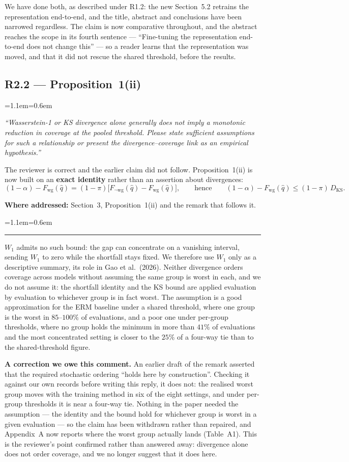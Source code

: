 \documentclass[11pt,a4paper]{article}
\newenvironment{reviewer}
  {\begin{list}{}{\leftmargin=1.1em\rightmargin=0.6em}\item[]\itshape\color{revgrey}\small}
  {\end{list}}
\newenvironment{revised}
  {\begin{list}{}{\leftmargin=1.1em\rightmargin=0.6em}\item[]%
   \color{black}\small\hspace{-1.1em}\textcolor{quoterule}{\rule[-0.4ex]{2pt}{1.05em}}\hspace{0.5em}\ignorespaces}
  {\end{list}}
\newcommand{\where}[1]{{\textbf{Where addressed:} #1\par}}
\newcommand{\rpoint}[2]{\subsection*{#1 --- #2}}
\begin{document}
We have done both, as described under R1.2: the new Section~5.2 retrains the representation
end-to-end, and the title, abstract and conclusions have been narrowed regardless. The claim is now
comparative throughout, and the abstract reaches the scope in its fourth sentence ---
``Fine-tuning the representation end-to-end does not change this'' --- so a reader learns that the
representation was moved, and that it did not rescue the shared threshold, before the results.

\rpoint{R2.2}{Proposition~1(ii)}

\begin{reviewer}
``Wasserstein-1 or KS divergence alone generally does not imply a monotonic reduction in coverage at
the pooled threshold. Please state sufficient assumptions for such a relationship or present the
divergence--coverage link as an empirical hypothesis.''
\end{reviewer}

The reviewer is correct and the earlier claim did not follow. Proposition~1(ii) is now built on an
\textbf{exact identity} rather than an assertion about divergences:
\[
(1-\alpha) - F_{\mathrm{wg}}(\hat q)
= (1-\pi)\bigl[F_{\neg\mathrm{wg}}(\hat q) - F_{\mathrm{wg}}(\hat q)\bigr],
\qquad\text{hence}\qquad
(1-\alpha) - F_{\mathrm{wg}}(\hat q) \le (1-\pi)\,D_{\mathrm{KS}} .
\]

\where{Section~3, Proposition~1(ii) and the remark that follows it.}

\begin{revised}
$W_1$ admits no such bound: the gap can concentrate on a vanishing interval, sending $W_1$
to zero while the shortfall stays fixed. We therefore use $W_1$ only as a descriptive summary, its
role in Gao et al.\ (2026). Neither divergence orders coverage across models without assuming the
same group is worst in each, and we do not assume it: the shortfall identity and the KS bound are
applied evaluation by evaluation to whichever group is in fact worst. The assumption is a good approximation for
the ERM baseline under a shared threshold, where one group is the worst in $85$--$100\%$ of
evaluations, and a poor one under per-group thresholds, where no group holds the minimum in more
than $41\%$ of evaluations and the most concentrated setting is closer to the $25\%$ of a four-way tie than to the
shared-threshold figure.
\end{revised}

\textbf{A correction we owe this comment.} An earlier draft of the remark asserted that the
required stochastic ordering ``holds here by construction''. Checking it against our own records
before writing this reply, it does not: the realised worst group moves with the training method in
six of the eight settings, and under per-group thresholds it is near a four-way tie. Nothing in the paper
needed the assumption --- the identity and the bound hold for whichever group is worst in a given
evaluation --- so the claim has been withdrawn rather than repaired, and Appendix~A now reports where the
worst group actually lands (Table~A1). This is the reviewer's point confirmed rather than answered
away: divergence alone does not order coverage, and we no longer suggest that it does here.
\end{document}
